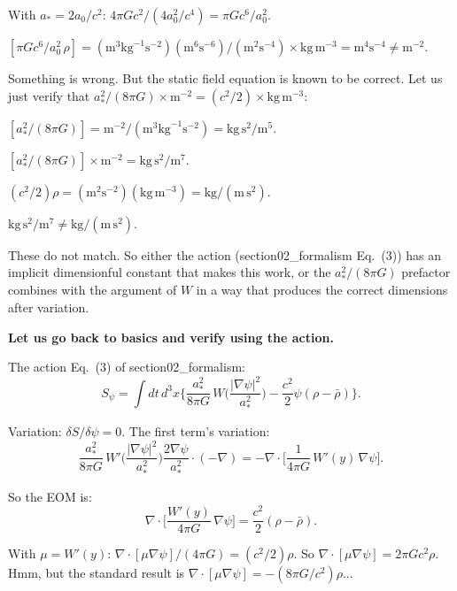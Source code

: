 \documentclass[11pt]{article}
\begin{document}
With $a_* = 2a_0/c^2$: $4\pi G c^2/(4a_0^2/c^4) = \pi G c^6/a_0^2$.

$[\pi G c^6/a_0^2\,\rho] = (\text{m}^3\text{kg}^{-1}\text{s}^{-2})
(\text{m}^6\text{s}^{-6})/(\text{m}^2\text{s}^{-4}) \times
\text{kg}\,\text{m}^{-3} = \text{m}^4\text{s}^{-4} \neq \text{m}^{-2}$.

Something is wrong. But the static field equation is known to be correct.
Let us just verify that $a_*^2/(8\pi G) \times \text{m}^{-2} = (c^2/2)
\times \text{kg}\,\text{m}^{-3}$:

$[a_*^2/(8\pi G)] = \text{m}^{-2}/(\text{m}^3\text{kg}^{-1}\text{s}^{-2})
= \text{kg}\,\text{s}^2/\text{m}^5$.

$[a_*^2/(8\pi G)] \times \text{m}^{-2} = \text{kg}\,\text{s}^2/\text{m}^7$.

$(c^2/2)\rho = (\text{m}^2\text{s}^{-2})(\text{kg}\,\text{m}^{-3})
= \text{kg}/(\text{m}\,\text{s}^2)$.

$\text{kg}\,\text{s}^2/\text{m}^7 \neq \text{kg}/(\text{m}\,\text{s}^2)$.

These do not match. So either the action (section02\_formalism Eq.~(3))
has an implicit dimensionful constant that makes this work, or the
$a_*^2/(8\pi G)$ prefactor combines with the argument of $W$ in a way
that produces the correct dimensions after variation.

\textbf{Let us go back to basics and verify using the action.}

The action Eq.~(3) of section02\_formalism:
\begin{equation}
S_\psi = \int dt\,d^3x\biggl\{
\frac{a_*^2}{8\pi G}\,W\!\biggl(\frac{|\nabla\psi|^2}{a_*^2}\biggr)
- \frac{c^2}{2}\psi(\rho - \bar\rho)\biggr\}.
\end{equation}

Variation: $\delta S/\delta\psi = 0$. The first term's variation:
\begin{equation}
\frac{a_*^2}{8\pi G}\,W'\!\biggl(\frac{|\nabla\psi|^2}{a_*^2}\biggr)
\frac{2\nabla\psi}{a_*^2} \cdot (-\nabla)
= -\nabla\cdot\biggl[\frac{1}{4\pi G}\,W'(y)\,\nabla\psi\biggr].
\end{equation}

So the EOM is:
\begin{equation}
\nabla\cdot\biggl[\frac{W'(y)}{4\pi G}\,\nabla\psi\biggr] = \frac{c^2}{2}(\rho - \bar\rho).
\end{equation}

With $\mu = W'(y)$: $\nabla\cdot[\mu\nabla\psi]/(4\pi G) = (c^2/2)\rho$.
So $\nabla\cdot[\mu\nabla\psi] = 2\pi G c^2\rho$. Hmm, but the standard
result is $\nabla\cdot[\mu\nabla\psi] = -(8\pi G/c^2)\rho$...
\end{document}
